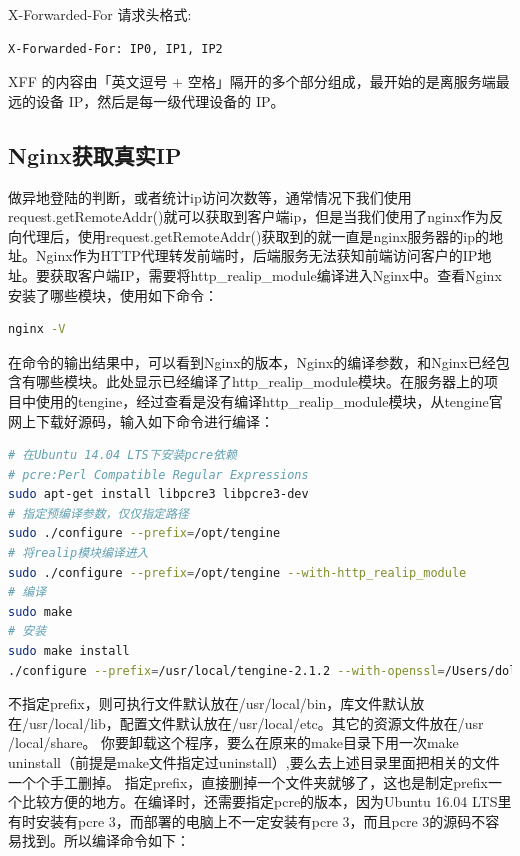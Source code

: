 \documentclass[letter]{book}
\begin{document}
X-Forwarded-For 请求头格式:

\begin{lstlisting}[language=bash]
X-Forwarded-For: IP0, IP1, IP2
\end{lstlisting}

XFF 的内容由「英文逗号 + 空格」隔开的多个部分组成，最开始的是离服务端最远的设备 IP，然后是每一级代理设备的 IP。

\subsection{Nginx获取真实IP}

做异地登陆的判断，或者统计ip访问次数等，通常情况下我们使用request.getRemoteAddr()就可以获取到客户端ip，但是当我们使用了nginx作为反向代理后，使用request.getRemoteAddr()获取到的就一直是nginx服务器的ip的地址。Nginx作为HTTP代理转发前端时，后端服务无法获知前端访问客户的IP地址。要获取客户端IP，需要将http\_realip\_module编译进入Nginx中。查看Nginx安装了哪些模块，使用如下命令：

\begin{lstlisting}[language=bash]
nginx -V
\end{lstlisting}

在命令的输出结果中，可以看到Nginx的版本，Nginx的编译参数，和Nginx已经包含有哪些模块。此处显示已经编译了http\_realip\_module模块。在服务器上的项目中使用的tengine，经过查看是没有编译http\_realip\_module模块，从tengine官网上下载好源码，输入如下命令进行编译：

\begin{lstlisting}[language=bash]
# 在Ubuntu 14.04 LTS下安装pcre依赖
# pcre:Perl Compatible Regular Expressions
sudo apt-get install libpcre3 libpcre3-dev
# 指定预编译参数，仅仅指定路径
sudo ./configure --prefix=/opt/tengine
# 将realip模块编译进入
sudo ./configure --prefix=/opt/tengine --with-http_realip_module
# 编译
sudo make
# 安装
sudo make install
./configure --prefix=/usr/local/tengine-2.1.2 --with-openssl=/Users/dolphin/source/openssl
\end{lstlisting}

不指定prefix，则可执行文件默认放在/usr/local/bin，库文件默认放在/usr/local/lib，配置文件默认放在/usr/local/etc。其它的资源文件放在/usr /local/share。
你要卸载这个程序，要么在原来的make目录下用一次make uninstall（前提是make文件指定过uninstall）,要么去上述目录里面把相关的文件一个个手工删掉。
指定prefix，直接删掉一个文件夹就够了，这也是制定prefix一个比较方便的地方。在编译时，还需要指定pcre的版本，因为Ubuntu 16.04 LTS里有时安装有pcre 3，而部署的电脑上不一定安装有pcre 3，而且pcre 3的源码不容易找到。所以编译命令如下：
\end{document}
